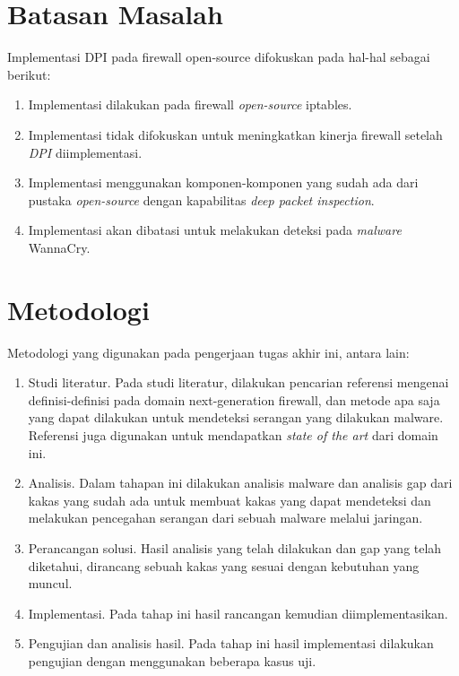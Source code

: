 \section{Batasan Masalah}
Implementasi DPI pada firewall open-source difokuskan pada hal-hal sebagai berikut:
\begin{enumerate}
	\item Implementasi dilakukan pada firewall \textit{open-source} iptables.
	\item Implementasi tidak difokuskan untuk meningkatkan kinerja firewall setelah \textit{DPI} diimplementasi.
	\item Implementasi menggunakan komponen-komponen yang sudah ada dari pustaka \textit{open-source} dengan kapabilitas \textit{deep packet inspection}.
	\item Implementasi akan dibatasi untuk melakukan deteksi pada \textit{malware} WannaCry.
\end{enumerate}

\section{Metodologi}
Metodologi yang digunakan pada pengerjaan tugas akhir ini, antara lain:
\begin{enumerate}
	\item Studi literatur. Pada studi literatur, dilakukan pencarian referensi mengenai
	definisi-definisi pada domain next-generation firewall, dan metode apa saja yang dapat 
	dilakukan untuk mendeteksi serangan yang dilakukan malware. Referensi juga
	digunakan untuk mendapatkan \textit{state of the art} dari domain ini.
	\item Analisis. Dalam tahapan ini dilakukan analisis malware dan analisis gap dari
	kakas yang sudah ada untuk membuat kakas yang dapat mendeteksi dan melakukan pencegahan
	serangan dari sebuah malware melalui jaringan.
	\item Perancangan solusi. Hasil analisis yang telah dilakukan dan gap yang telah diketahui,
	dirancang sebuah kakas yang sesuai dengan kebutuhan yang muncul.
	\item Implementasi. Pada tahap ini hasil rancangan kemudian diimplementasikan.
	\item Pengujian dan analisis hasil. Pada tahap ini hasil implementasi dilakukan
	pengujian dengan menggunakan beberapa kasus uji.
\end{enumerate}
